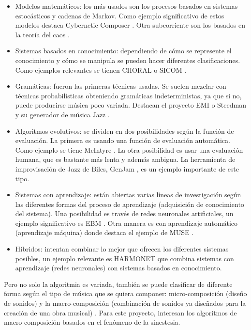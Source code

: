 \begin{itemize}
	\item Modelos matemáticos: los más usados son los procesos basados en sistemas estocásticos y cadenas de Markov. Como ejemplo significativo de estos modelos destaca Cybernetic Composer \cite{AIMusicSurvey}. Otra subcorriente son los basados en la teoría del caos \cite{ChaosTeoriaMusica}.
	\item Sistemas basados en conocimiento: dependiendo de cómo se represente el conocimiento y cómo se manipula se pueden hacer diferentes clasificaciones. Como ejemplos relevantes se tienen CHORAL \cite{HistoryAlgorithmicComp} o SICOM \cite{SICOM}.
	\item Gramáticas: fueron las primeras técnicas usadas. Se suelen mezclar con técnicas probabilísticas obteniendo gramáticas indeterministas, ya que si no, puede producirse música poco variada. Destacan el proyecto EMI \cite{HistoryAlgorithmicComp} o Steedman y su generador de música Jazz \cite{AIMethodsForComposition}.
	\item Algoritmos evolutivos: se dividen en dos posibilidades según la función de evaluación. La primera es usando una función de evaluación automática. Como ejemplo se tiene McIntyre \cite{AIMethodsForComposition}. La otra posibilidad es usar una evaluación humana, que es bastante más lenta y además ambigua. La herramienta de improvisación de Jazz de Biles, GenJam \cite{GenJam}, es un ejemplo importante de este tipo.
	\item Sistemas con aprendizaje: están abiertas varias líneas de investigación según las diferentes formas del proceso de aprendizaje (adquisición de conocimiento del sistema). Una posibilidad es través de redes neuronales artificiales, un ejemplo significativo es EBM \cite{AIMethodsForComposition}. Otra manera es con aprendizaje automático (aprendizaje máquina) donde destaca el ejemplo de MUSE \cite{AIMethodsForComposition}.
	\item Híbridos: intentan combinar lo mejor que ofrecen los diferentes sistemas posibles, un ejemplo relevante es HARMONET \cite{AIMethodsForComposition} que combina sistemas con aprendizaje (redes neuronales) con sistemas basados en conocimiento.\\
\end{itemize}


Pero no solo la algoritmia es variada, también se puede clasificar de diferente forma según el tipo de música que se quiera componer: micro-composición (diseño de sonidos) y la macro-composición (combinación de sonidos ya diseñados para la creación de una obra musical) \cite{AudioVisualSurvey}. Para este proyecto, interesan los algoritmos de macro-composición basados en el fenómeno de la sinestesia.\\ 

